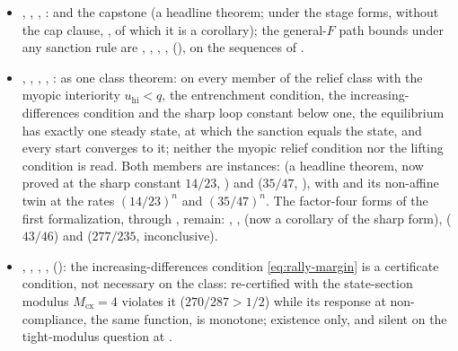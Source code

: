 \begin{itemize}[leftmargin=1.4em,itemsep=1pt]
\item {}, , , :  and the capstone (a headline theorem; under the stage forms, without the cap clause, , of which it is a corollary); the general-$F$ path bounds under any sanction rule are , , , ,  (), on the sequences of .
\item {}, , , , :  as one class theorem: on every member of the relief class with the myopic interiority $u_{\mathrm{hi}}<q$, the entrenchment condition, the increasing-differences condition and the sharp loop constant below one, the equilibrium has exactly one steady state, at which the sanction equals the state, and every start converges to it; neither the myopic relief condition nor the lifting condition is read. Both members are instances:  (a headline theorem, now proved at the sharp constant $14/23$, ) and  ($35/47$, ), with  and its non-affine twin at the rates $(14/23)^n$ and $(35/47)^n$. The factor-four forms of the first formalization, through , remain: , ,  (now a corollary of the sharp form),  ($43/46$) and  ($277/235$, inconclusive).
\item {}, , , ,  (): the increasing-differences condition \eqref{eq:rally-margin} is a certificate condition, not necessary on the class:  re-certified with the state-section modulus $M_{\mathrm{cx}}=4$ violates it ($270/287>1/2$) while its response at non-compliance, the same function, is monotone; existence only, and silent on the tight-modulus question at .

\end{itemize}
